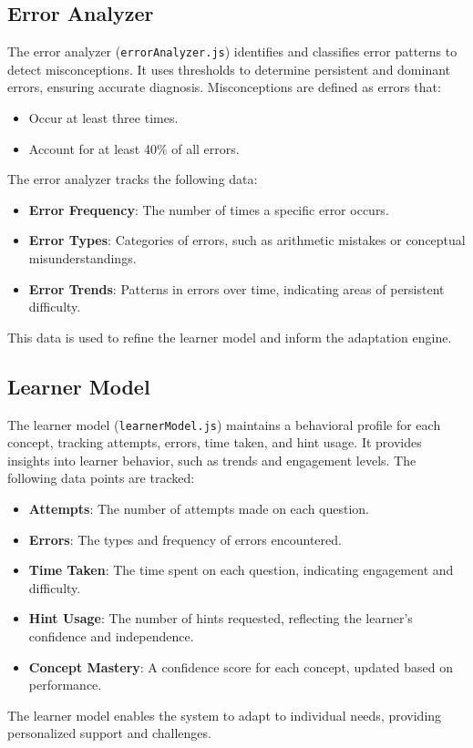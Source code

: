 \documentclass{article}
\begin{document}
\subsection{Error Analyzer}
The error analyzer (\texttt{errorAnalyzer.js}) identifies and classifies error patterns to detect misconceptions. It uses thresholds to determine persistent and dominant errors, ensuring accurate diagnosis. Misconceptions are defined as errors that:
\begin{itemize}
    \item Occur at least three times.
    \item Account for at least 40\% of all errors.
\end{itemize}
The error analyzer tracks the following data:
\begin{itemize}
    \item \textbf{Error Frequency}: The number of times a specific error occurs.
    \item \textbf{Error Types}: Categories of errors, such as arithmetic mistakes or conceptual misunderstandings.
    \item \textbf{Error Trends}: Patterns in errors over time, indicating areas of persistent difficulty.
\end{itemize}
This data is used to refine the learner model and inform the adaptation engine.

\subsection{Learner Model}
The learner model (\texttt{learnerModel.js}) maintains a behavioral profile for each concept, tracking attempts, errors, time taken, and hint usage. It provides insights into learner behavior, such as trends and engagement levels. The following data points are tracked:
\begin{itemize}
    \item \textbf{Attempts}: The number of attempts made on each question.
    \item \textbf{Errors}: The types and frequency of errors encountered.
    \item \textbf{Time Taken}: The time spent on each question, indicating engagement and difficulty.
    \item \textbf{Hint Usage}: The number of hints requested, reflecting the learner's confidence and independence.
    \item \textbf{Concept Mastery}: A confidence score for each concept, updated based on performance.
\end{itemize}
The learner model enables the system to adapt to individual needs, providing personalized support and challenges.
\end{document}
